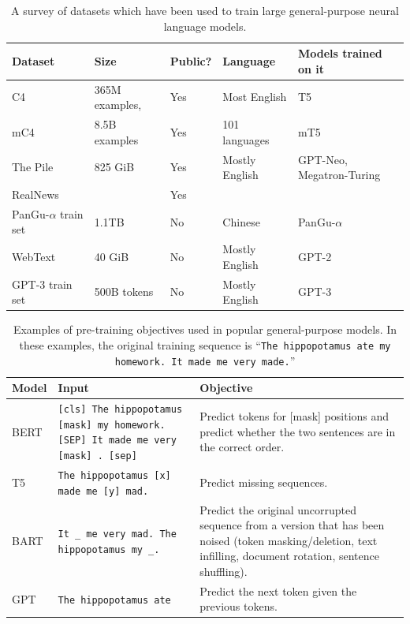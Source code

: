 \begin{itemize}
\begin{table}
  \centering
  \small
  \caption{A survey of datasets which have been used to train large general-purpose neural language models.}
  \label{tab:dataset_list}%
    \begin{tabular}{l|l|l|l|l}
    \toprule
    \textbf{Dataset} & \multicolumn{1}{l}{\textbf{Size}} & \multicolumn{1}{l}{\textbf{Public?}} & \textbf{Language} & \multicolumn{1}{l}{\textbf{Models trained on it}} \\
    \hline
    C4 \citep{raffel2019exploring}   &  365M examples,      & {Yes} & Most English & {T5} \\
    mC4 \citep{xue2020mt5}   &  8.5B examples  & {Yes} & 101 languages & {mT5} \\
    The Pile \citep{gao2020pile} & 825 GiB & {Yes} & Mostly English & {GPT-Neo, Megatron-Turing} \\
    RealNews &       & {Yes} &       \\
    PanGu-$\alpha$ train set & {1.1TB} & {No} & Chinese & {PanGu-$\alpha$} \\
    WebText &  40 GiB & {No} & Mostly English &  {GPT-2} \\
    GPT-3 train set & {500B tokens} & {No} & Mostly English & {GPT-3} \\
    \bottomrule
    \end{tabular}%
\end{table}%


\begin{table}
    \centering
    \small
    \caption{Examples of pre-training objectives used in popular general-purpose models.
    In these examples, the original training sequence is ``\texttt{The hippopotamus ate my homework. It made me very made.}''}
    \label{tab:common_pretrained_models}
	\begin{tabular}{l|p{2in}|p{2in}}
        \toprule 
        \textbf{Model} & \textbf{Input} & \textbf{Objective} \\
        \hline
        BERT \citep{devlin2018bert} & \texttt{[cls] The hippopotamus [mask] my homework. [SEP] It made me very [mask] . [sep]} &  Predict tokens for [mask] positions and predict whether the two sentences are in the correct order.\\
	\midrule
        T5 \citep{raffel2019exploring} & \texttt{The hippopotamus [x] made me [y] mad.} & Predict missing sequences.  \\
	\midrule
        BART & \texttt{It \_ me very mad. The hippopotamus my \_.} &  Predict the original uncorrupted sequence from a version that has been noised (token masking/deletion, text infilling, document rotation, sentence shuffling). \\
	\midrule
        GPT \citep{radford2019language,brown2020language} & \texttt{The hippopotamus ate} & Predict the next token given the previous tokens.\\
        \bottomrule
    \end{tabular}
\end{table}


\end{itemize}
